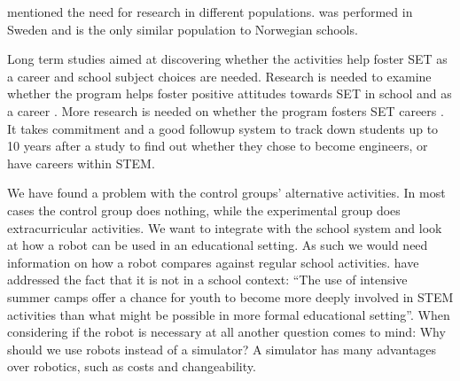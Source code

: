 \bigskip\noindent
{} mentioned the need for research in different populations.  was performed in Sweden and is the only similar population to Norwegian schools. %

\bigskip\noindent
Long term studies aimed at discovering whether the activities help foster SET as a career and school subject choices are needed. Research is needed to examine whether the program helps foster positive attitudes towards SET in school and as a career . More research is needed on whether the program fosters SET careers \cite{barker2007robotics}. It takes commitment and a good followup system to track down students up to 10 years after a study to find out whether they chose to become engineers, or have careers within STEM. %

\bigskip\noindent
We have found a problem with the control groups' alternative activities. In most cases the control group does nothing, while the experimental group does extracurricular activities. We want to integrate with the school system and look at how a robot can be used in an educational setting. As such we would need information on how a robot compares against regular school activities. 
 have addressed the fact that it is not in a school context: ``The use of intensive summer camps offer a chance for youth to become more deeply involved in STEM activities than what might be possible in more formal educational setting''. When considering if the robot is necessary at all another question comes to mind: Why should we use robots instead of a simulator? A simulator has many advantages over robotics, such as costs and changeability. %
